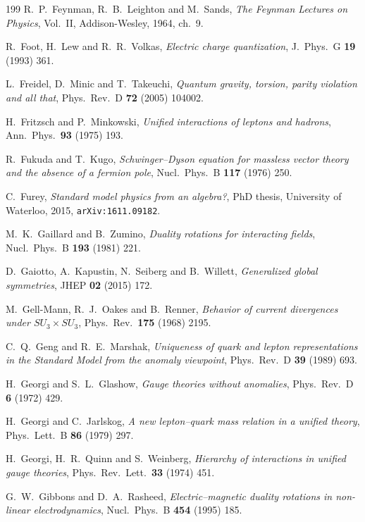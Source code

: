 \begin{thebibliography}{199}
 R.~P.~Feynman, R.~B.~Leighton and M.~Sands, \emph{The Feynman Lectures on Physics}, Vol.~II, Addison-Wesley, 1964, ch.~9.

 R.~Foot, H.~Lew and R.~R.~Volkas, \emph{Electric charge quantization}, J.~Phys.~G \textbf{19} (1993) 361.

 L.~Freidel, D.~Minic and T.~Takeuchi, \emph{Quantum gravity, torsion, parity violation and all that}, Phys.~Rev.~D \textbf{72} (2005)
104002.

 H.~Fritzsch and P.~Minkowski, \emph{Unified interactions of leptons and hadrons}, Ann.~Phys.~\textbf{93} (1975) 193.

 R.~Fukuda and T.~Kugo, \emph{Schwinger--Dyson equation for massless vector theory and the absence of a fermion pole},
Nucl.~Phys.~B \textbf{117} (1976) 250.

 C.~Furey, \emph{Standard model physics from an algebra?}, PhD thesis, University of Waterloo, 2015, \texttt{arXiv:1611.09182}.

 M.~K.~Gaillard and B.~Zumino, \emph{Duality rotations for interacting fields}, Nucl.~Phys.~B \textbf{193} (1981) 221.

 D.~Gaiotto, A.~Kapustin, N.~Seiberg and B.~Willett, \emph{Generalized global symmetries}, JHEP \textbf{02} (2015) 172.

 M.~Gell-Mann, R.~J.~Oakes and B.~Renner, \emph{Behavior of current divergences under $SU_3\times SU_3$}, Phys.~Rev.~\textbf{175} (1968) 2195.

 C.~Q.~Geng and R.~E.~Marshak, \emph{Uniqueness of quark and lepton representations in the Standard Model from the anomaly viewpoint},
Phys.~Rev.~D \textbf{39} (1989) 693.

 H.~Georgi and S.~L.~Glashow, \emph{Gauge theories without anomalies}, Phys.~Rev.~D \textbf{6} (1972) 429.

 H.~Georgi and C.~Jarlskog, \emph{A new lepton--quark mass relation in a unified theory}, Phys.~Lett.~B \textbf{86} (1979) 297.

 H.~Georgi, H.~R.~Quinn and S.~Weinberg, \emph{Hierarchy of interactions in unified gauge theories}, Phys.~Rev.~Lett.~\textbf{33} (1974) 451.

 G.~W.~Gibbons and D.~A.~Rasheed, \emph{Electric--magnetic duality rotations in non-linear electrodynamics}, Nucl.~Phys.~B \textbf{454} (1995) 185.


\end{thebibliography}
